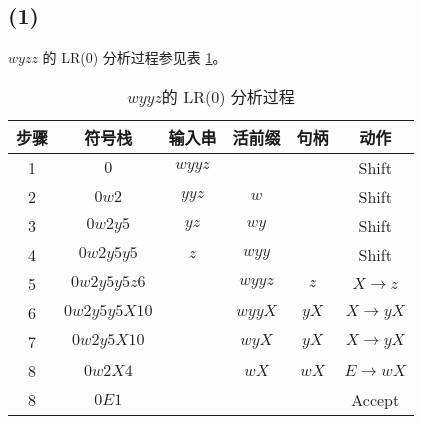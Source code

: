 \documentclass[UTF8]{ctexart}
\begin{document}
    \subsection*{(1)}
        $wyzz$ 的 LR(0) 分析过程参见表 \ref{wyyz}。
        \begin{table}[htbp!]
            \centering
            \begin{tabular}{|c|c|c|c|c|c|}
                \hline
                步骤 & 符号栈 & 输入串 & 活前缀 & 句柄 & 动作 \\
                \hline
                1 & $0$ & $wyyz$ &  &  & Shift \\
                \hline
                2 & $0w2$ & $yyz$ & $w$ & & Shift \\
                \hline
                3 & $0w2y5$ & $yz$ & $wy$ & & Shift \\
                \hline
                4 & $0w2y5y5$ & $z$ & $wyy$ & & Shift \\
                \hline
                5 & $0w2y5y5z6$ &  & $wyyz$ & $z$ & $X\to z$ \\
                \hline
                6 & $0w2y5y5X10$ &  & $wyyX$ & $yX$ & $X\to yX$ \\
                \hline
                7 & $0w2y5X10$ &  & $wyX$ & $yX$ & $X\to yX$ \\
                \hline
                8 & $0w2X4$ &  & $wX$ & $wX$ & $E\to wX$ \\
                \hline
                8 & $0E1$ &  &  &  & Accept \\
                \hline
            \end{tabular}
            \caption{$wyyz$的 LR(0) 分析过程}
            \label{wyyz}
        \end{table}
    
\end{document}
